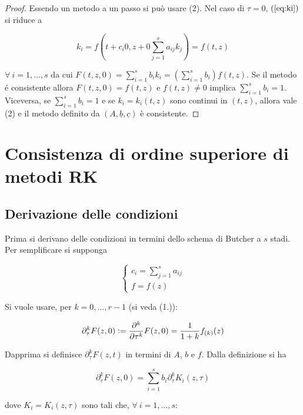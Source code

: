 \documentclass[hidelinks, 10pt]{report}
\begin{document}
\begin{proof}
Essendo un metodo a un passo si pu\`o usare  (2). Nel caso di $ \tau = 0 $, $ (\ref{eq:ki}) $ si riduce a

\[ k_{i} = f \left(t + c_{i} 0, z + 0 \sum\limits_{j = 1}^{s} a_{ij} k_{j} \right) = f(t, z) \]

$ \forall\ i = 1, \dotsc, s $ da cui $ F(t, z, 0) = \sum\limits_{i = 1}^{s} b_{i} k_{i} = \left( \sum\limits_{i = 1}^{s} b_{i} \right) f(t, z) $. Se il metodo \'e consistente allora $ F(t, z, 0) = f(t, z) $ e $ f(t, z) \ne 0 $ implica $ \sum\limits_{i = 1}^{s} b_{i} = 1 $. Viceversa, se $ \sum\limits_{i = 1}^{s} b_{i} = 1 $ e se $ k_{i} = k_{i} (t, z) $ sono continui in $ (t, z) $, allora vale  (2)  e il metodo definito da $ (A, \underline{b}, \underline{c}) $ \`e consistente.
\end{proof}

\section{Consistenza di ordine superiore di metodi RK}
\subsection{Derivazione delle condizioni}

Prima si derivano delle condizioni in termini dello schema di Butcher a $ s $ stadi. Per semplificare si supponga

\begin{equation}	\label{eq:ci+f}
\begin{cases}
c_{i} = \sum\limits_{j = 1}^{s} a_{ij} \\
f = f(z)
\end{cases}
\end{equation} 

Si vuole usare, per $ k = 0, \dotsc, r - 1 $ (si veda  (1.)):

\[ \partial^{k}_{\tau} F(z, 0) \vcentcolon= \frac{\partial^{k}}{\partial \tau^{k}} F(z, 0) = \frac{1}{1 + k} f_{(k)} (z) \]

Dapprima si definisce $ \partial^{k}_{\tau} F(z, t)  $ in termini di $ A $, $ b $ e $ f $. Dalla definizione si ha

\[ \partial^{k}_{\tau} F(z, 0) = \sum\limits_{i = 1}^{s} b_{i} \partial^{k}_{\tau} K_{i}(z, \tau) \]

dove $ K_{i} = K_i(z, \tau) $ sono tali che, $ \forall\ i = 1, \dotsc, s $:
\end{document}
